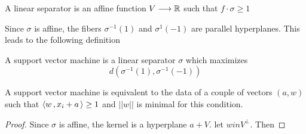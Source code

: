 \begin{definition}
A linear separator is an affine function $V\longrightarrow \mathbb{R}$ such that $f\cdot \sigma \ge 1$
\end{definition}

Since $\sigma$ is affine, the fibers $\sigma^{-1}(1)$ and $\sigma^{1}(-1)$ are parallel hyperplanes. This leads to the following definition

\begin{definition}
A support vector machine is a linear separator $\sigma$ which maximizes
\[
d(\sigma^{-1}(1),\sigma^{-1}(-1))
\]	
\end{definition}

\begin{theorem}
A support vector machine is equivalent to the data of a couple of vectors $(a,w)$such that $\left\langle w\,,x_i+a\, \right\rangle\ge 1$ and $\vert \vert w\vert \vert$ is minimal	for this condition.
\end{theorem}

\begin{proof}
Since $\sigma$ is affine, the kernel is a hyperplane $a+V$. let $w in V^{\perp}$. Then	
\end{proof}

